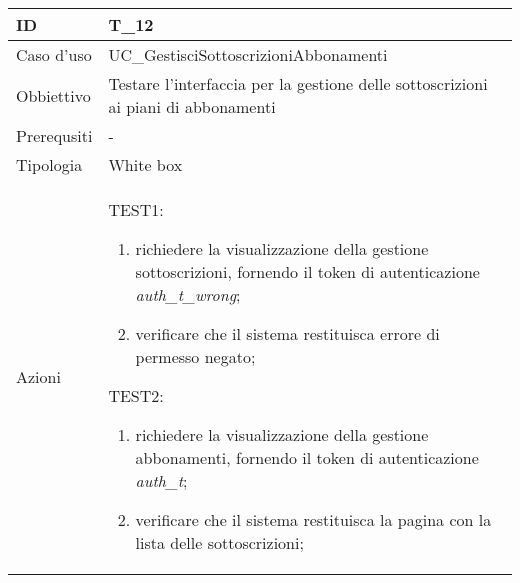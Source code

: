 \begin{table}[hb]
    \centering
    \begin{tabular}{ |p{2cm}|p{10cm}|  }
        \hline
        ID & T\_12 \\\hline
        Caso d'uso & UC\_GestisciSottoscrizioniAbbonamenti \\\hline   
        Obbiettivo & Testare l'interfaccia per la gestione delle sottoscrizioni ai piani di abbonamenti \\\hline
        Prerequsiti & - \\\hline
        Tipologia & White box \\\hline
        Azioni & 
        TEST1:
        \begin{enumerate}[topsep=0pt]
            \item richiedere la visualizzazione della gestione sottoscrizioni, fornendo il token di autenticazione \emph{auth\_t\_wrong};
            \item verificare che il sistema restituisca errore di permesso negato;
        \end{enumerate}
        \vspace{0.5cm} TEST2:
        \begin{enumerate}[topsep=0pt]
            \item richiedere la visualizzazione della gestione abbonamenti, fornendo il token di autenticazione \emph{auth\_t};
            \item verificare che il sistema restituisca la pagina con la lista delle sottoscrizioni;
        \end{enumerate}
        \\\hline
    \end{tabular}
\end{table}


